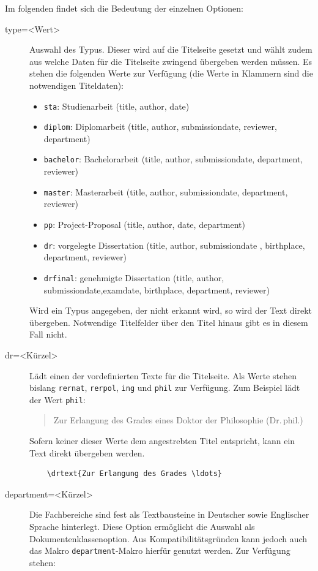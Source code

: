 \documentclass[
	ngerman,
	ruledheaders=chapter,%
	class=book,%
	thesis={
		type=dr,
		dr=rernat
	},
	accentcolor=9c,%
	custommargins=true,%
	marginpar=false,%
	fontsize=11pt,%
]{tudapub}
\let\code\texttt
\begin{document}
Im folgenden findet sich die Bedeutung der einzelnen Optionen:
\begin{description}
\item[type=<Wert>] Auswahl des Typus. Dieser wird auf die Titelseite gesetzt und wählt zudem aus welche Daten für die Titelseite zwingend übergeben werden müssen.
	Es stehen die folgenden Werte zur Verfügung (die Werte in Klammern sind die notwendigen Titeldaten):
	\begin{itemize}
	\item \code{sta}: Studienarbeit (title, author, date)
	\item \code{diplom}: Diplomarbeit (title, author, submissiondate, reviewer, department)
	\item \code{bachelor}: Bachelorarbeit (title, author, submissiondate, department, reviewer)
	\item \code{master}: Masterarbeit (title, author, submissiondate, department, reviewer)
	\item \code{pp}: Project-Proposal  (title, author, date, department)
	\item \code{dr}: vorgelegte Dissertation (title, author, submissiondate , birthplace, department, reviewer)
	\item \code{drfinal}: genehmigte Dissertation (title, author, submissiondate,examdate, birthplace, department, reviewer)
	\end{itemize}
	Wird ein Typus angegeben, der nicht erkannt wird, so wird der Text direkt übergeben. Notwendige Titelfelder über den Titel hinaus gibt es in diesem Fall nicht.
\item[dr=<Kürzel>] Lädt einen der vordefinierten Texte für die Titelseite. Als Werte stehen bislang \code{rernat}, \code{rerpol}, \code{ing} und \code{phil} zur Verfügung. Zum Beispiel lädt der Wert \code{phil}:
	\begin{quote}
	Zur Erlangung des Grades eines Doktor der Philosophie (Dr.\,phil.)
	\end{quote}
	Sofern keiner dieser Werte dem angestrebten Titel entspricht, kann ein Text direkt übergeben werden.
	\begin{verbatim}
	\drtext{Zur Erlangung des Grades \ldots}
	\end{verbatim}
\item[department=<Kürzel>] Die Fachbereiche sind fest als Textbausteine in Deutscher sowie Englischer Sprache hinterlegt. Diese Option ermöglicht die Auswahl als Dokumentenklassenoption. Aus Kompatibilitätsgründen kann jedoch auch das Makro \code{department}-Makro hierfür genutzt werden. Zur Verfügung stehen:\par

\end{description}
\end{document}

